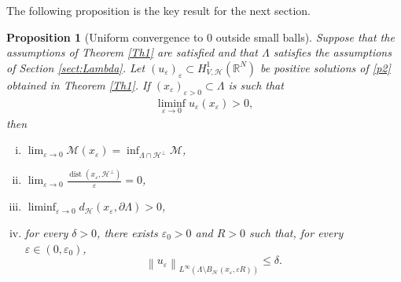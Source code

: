 \documentclass[a4paper]{amsart}
\newtheorem{proposition}{Proposition}[section]
\begin{document}
The following proposition is the key result for the next section.
\begin{proposition}[Uniform convergence to $0$ outside small balls]\label{Prop1}
 Suppose that the assumptions of Theorem \ref{Th1} are satisfied and that $\Lambda$ satisfies the assumptions of
Section \ref{sect:Lambda}.
Let $(u_{\varepsilon})_{\varepsilon} \subset H^1_{V,\mathcal{H}}({\mathbb{R}}^N)$ be positive solutions of \eqref{p2} obtained in
Theorem \ref{Th1}. If $(x_{\varepsilon})_{\varepsilon>0} \subset \Lambda$ is such that
\begin{align*}
 \liminf_{\varepsilon\to 0} u_{\varepsilon}(x_{\varepsilon}) > 0,
\end{align*}
then
\begin{enumerate}[(i)]
 \item $\lim_{\varepsilon\to 0} \mathcal{M}(x_{\varepsilon}) = \inf_{\Lambda \cap \mathcal{H}^\perp} \mathcal{M}$,
 \item $\lim_{\varepsilon \to 0} \frac{{\mathop{\mathrm{dist}}}(x_\varepsilon, \mathcal{H}^\perp)}{\varepsilon}=0$,
 \item $\liminf_{\varepsilon \to 0} d_{\mathcal{H}}(x_{\varepsilon}, \partial \Lambda) > 0$,
 \item for every $\delta>0$, there exists $\varepsilon_0>0$ and $R>0$ such that, for every $\varepsilon \in (0,\varepsilon_0)$,
\[
 {\left\| {u_{\varepsilon}} \right\|}_{L^{\infty}\left(\Lambda\setminus B_{\mathcal{H}}(x_{\varepsilon},\varepsilon R)\right)} \leq \delta.
\]
\end{enumerate}
\end{proposition}
\end{document}

